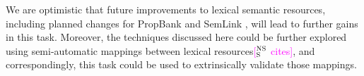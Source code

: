 \documentclass[11pt,a4paper]{article}
\newcommand{\ensuretext}[1]{#1}
\newcommand{\nssmarker}{\ensuretext{\textcolor{magenta}{\ensuremath{^{\textsc{NS}}_{\textsc{S}}}}}}
\newcommand{\arkcomment}[3]{\ensuretext{\textcolor{#3}{[#1 #2]}}}
\newcommand{\nss}[1]{\arkcomment{\nssmarker}{#1}{magenta}}
\newcommand{\finalversion}[1]{}
\begin{document}
We are optimistic that future improvements to lexical semantic resources, 
including planned changes for PropBank \citep{bonial-14} and SemLink \citep{bonial-13}, 
will lead to further gains in this task. 
Moreover, the techniques discussed here could be further explored 
using semi-automatic mappings between lexical resources\nss{cites}, 
and correspondingly, this task could be used to extrinsically validate those mappings.

\finalversion{\section*{Acknowledgments}

FUNDING}

\smaller


\setlength{\bibsep}{1pt}
{\fontsize{10}{12.25}\selectfont
}
\end{document}
